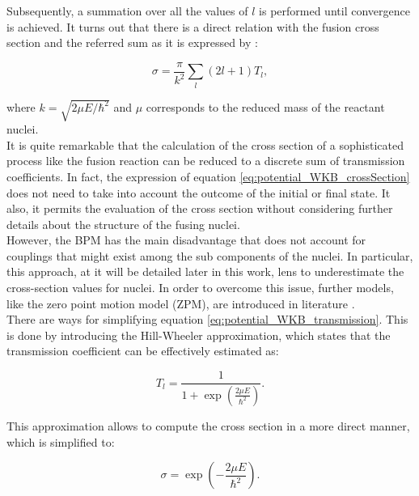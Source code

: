 \documentclass[openany]{book}
\begin{document}
Subsequently, a summation over all the values of $l$ is performed until convergence is achieved. It turns out that there is a direct relation with the fusion cross section and the referred sum as it is expressed by \cite{koyuncu_soylu_2018, nobre_chamon_gasques_carlson_thompson_2007}:

\begin{equation} \label{eq:potential_WKB_crossSection}
	\sigma = \frac{\pi}{k^2} \sum_{l}{(2l + 1)T_l},  
\end{equation}

where $k = \sqrt{2\mu E / \hbar^2}$ and $\mu$ corresponds to the reduced mass of the reactant nuclei.  \\

It is quite remarkable that the calculation of the cross section of a sophisticated process like the fusion reaction can be reduced to a discrete sum of transmission coefficients. In fact, the expression of equation \ref{eq:potential_WKB_crossSection} does not need to take into account the outcome of the initial or final state. It also, it permits the evaluation of the cross section without considering further details about the structure of the fusing nuclei.  \\

However, the BPM has the main disadvantage that does not account for couplings that might exist among the sub components of the nuclei. In particular, this approach, at it will be detailed later in this work, lens to underestimate the cross-section values for nuclei. In order to overcome this issue, further models, like the zero point motion model (ZPM), are introduced in literature \cite{duarte_gasques_oliveira_zagatto_chamon_medina_added_seale_alcantara-nunez_rossi_et_2015, nobre_chamon_gasques_carlson_thompson_2007}.   \\  

There are ways for simplifying equation   \ref{eq:potential_WKB_transmission}. This is done by introducing the Hill-Wheeler approximation, which states that the transmission coefficient can be effectively estimated as: 

\begin{equation} \label{eq:potential_WKB_transmission_HW}
	T_l =  \frac{1}{1 + \exp {\left ( \frac {2\mu E} {\hbar^2} \right)} }.
\end{equation}

This approximation allows to compute the cross section in a more direct manner, which is simplified to: 

\begin{equation} \label{eq:potential_WKB_crossSection_HW}
	\sigma = \exp{\left( - \frac{2\mu E}{\hbar^2}\right)}.
\end{equation}
\end{document}
